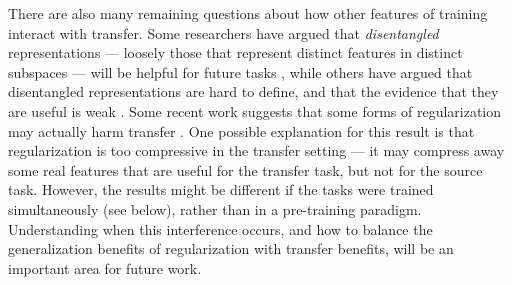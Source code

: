 There are also many remaining questions about how other features of training interact with transfer. Some researchers have argued that \emph{disentangled} representations --- loosely those that represent distinct features in distinct subspaces --- will be helpful for future tasks \citep{Higgins2018}, while others have argued that disentangled representations are hard to define, and that the evidence that they are useful is weak \citep{Locatello2019}. Some recent work suggests that some forms of regularization may actually harm transfer \citep{Kornblith2019}. One possible explanation for this result is that regularization is too compressive in the transfer setting --- it may compress away some real features that are useful for the transfer task, but not for the source task. However, the results might be different if the tasks were trained simultaneously (see below), rather than in a pre-training paradigm. Understanding when this interference occurs, and how to balance the generalization benefits of regularization with transfer benefits, will be an important area for future work. \par

